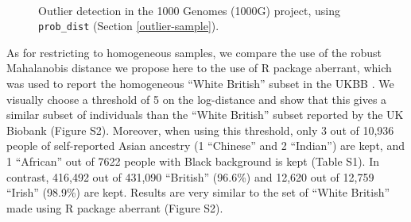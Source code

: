 \documentclass{bioinfo}
\begin{document}
\begin{figure}[htb]
	\centering
	 $~~~$
	 $~~~~~$
	\caption{Outlier detection in the 1000 Genomes (1000G) project, using \texttt{prob\_dist} (Section \ref{outlier-sample}).\label{fig:outlier-pd}}
\end{figure}

As for restricting to homogeneous samples, we compare the use of the robust Mahalanobis distance we propose here to the use of R package aberrant, which was used to report the homogeneous ``White British'' subset in the UKBB \cite[]{bellenguez2011robust,bycroft2017genome}.
We visually choose a threshold of 5 on the log-distance and show that this gives a similar subset of individuals than the ``White British'' subset reported by the UK Biobank (Figure S2).
Moreover, when using this threshold, only 3 out of 10,936 people of self-reported Asian ancestry (1 ``Chinese'' and 2 ``Indian'') are kept, and 1 ``African'' out of 7622 people with Black background is kept (Table S1). 
In contrast, 416,492 out of 431,090 ``British'' (96.6\%) and 12,620 out of 12,759 ``Irish'' (98.9\%) are kept.
Results are very similar to the set of ``White British'' made using R package aberrant (Figure S2).
\end{document}
